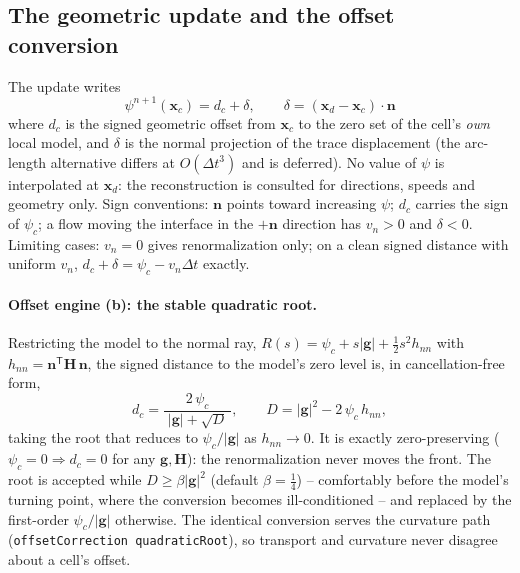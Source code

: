 \documentclass[preprint,3p,11pt]{elsarticle}
\newcommand{\psilev}{\psi}
\newcommand{\xc}{\mathbf{x}_c}
\newcommand{\xd}{\mathbf{x}_d}
\newcommand{\nv}{\mathbf{n}}
\newcommand{\gv}{\mathbf{g}}
\newcommand{\Hm}{\mathbf{H}}
\begin{document}
\subsection{The geometric update and the offset conversion}
\label{sec:update}

The update writes
\begin{equation}
  \boxed{\;\psilev^{n+1}(\xc)=d_c+\delta,\qquad
  \delta=(\xd-\xc)\cdot\nv\;}
  \label{eq:update}
\end{equation}
where $d_c$ is the signed geometric offset from $\xc$ to the zero set of the
cell's \emph{own} local model, and $\delta$ is the normal projection of the
trace displacement (the arc-length alternative differs at
$O(\Delta t^{3})$ and is deferred). No value of $\psilev$ is interpolated at
$\xd$: the reconstruction is consulted for directions, speeds and geometry
only. Sign conventions: $\nv$ points toward increasing $\psilev$; $d_c$
carries the sign of $\psilev_c$; a flow moving the interface in the $+\nv$
direction has $v_n>0$ and $\delta<0$. Limiting cases: $v_n=0$ gives
renormalization only; on a clean signed distance with uniform $v_n$,
$d_c+\delta=\psilev_c-v_n\Delta t$ exactly.

\paragraph{Offset engine (b): the stable quadratic root.}
Restricting the model to the normal ray, $R(s)=\psilev_c+s\lvert\gv\rvert
+\tfrac12 s^2 h_{nn}$ with $h_{nn}=\nv^{\mathsf T}\Hm\,\nv$, the signed
distance to the model's zero level is, in cancellation-free form,
\begin{equation}
  d_c=\frac{2\,\psilev_c}{\;\lvert\gv\rvert+\sqrt{D}\;},
  \qquad D=\lvert\gv\rvert^{2}-2\,\psilev_c\,h_{nn},
  \label{eq:root}
\end{equation}
taking the root that reduces to $\psilev_c/\lvert\gv\rvert$ as $h_{nn}\to0$.
It is exactly zero-preserving ($\psilev_c=0\Rightarrow d_c=0$ for any
$\gv,\Hm$): the renormalization never moves the front. The root is accepted
while $D\ge\beta\lvert\gv\rvert^{2}$ (default $\beta=\tfrac14$) -- comfortably
before the model's turning point, where the conversion becomes
ill-conditioned -- and replaced by the first-order $\psilev_c/\lvert\gv\rvert$
otherwise. The identical conversion serves the curvature path
(\texttt{offsetCorrection quadraticRoot}), so transport and curvature never
disagree about a cell's offset.
\end{document}
